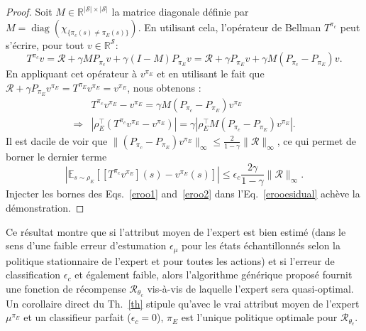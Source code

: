\documentclass[french,utf8]{./hermes-journal}
\newcommand{\diag}{\operatorname*{diag}}
\newcommand{\R}{\mathcal{R}}
\newcommand{\s}{\mathcal{S}}
\newcommand{\E}{\mathbb{E}}
\begin{document}
\begin{proof}
   Soit $M\in\mathbb{R}^{|\s|\times |\s|}$ la matrice diagonale définie par $M = \diag (\chi_{\{\pi_c(s)\neq\pi_E(s)\}})$. En utilisant cela, l'opérateur de Bellman $T^{\pi_c}$ peut s'écrire, pour tout $v\in\mathbb{R}^\s$:
  \begin{equation}
    T^{\pi_c}v = \R + \gamma M P_{\pi_c} v + \gamma (I-M)P_{\pi_E} v
    = \R + \gamma P_{\pi_E} v + \gamma M (P_{\pi_c}-P_{\pi_E})v.
  \end{equation}
  En appliquant cet opérateur à  $v^{\pi_E}$ et en utilisant le fait que $\R +
  \gamma P_{\pi_E} v^{\pi_E} = T^{\pi_E} v^{\pi_E} = v^{\pi_E}$, nous obtenons :
  \begin{align}
    &T^{\pi_c}v^{\pi_E} - v^{\pi_E} = \gamma M
    (P_{\pi_c}-P_{\pi_E})v^{\pi_E}
    \\\Rightarrow &|\rho_E^\top (T^{\pi_c}v^{\pi_E} - v^{\pi_E})| = \gamma
    |\rho_E^\top M (P_{\pi_c}-P_{\pi_E})v^{\pi_E}|.
  \end{align}
  Il est dacile de voir que $\|(P_{\pi_c}-P_{\pi_E})v^{\pi_E}\|_\infty
  \leq \frac{2}{1-\gamma}\|\R\|_\infty$, ce qui permet de borner le dernier terme
  \begin{equation}
    |\E_{s\sim\rho_E}[[T^{\pi_c}v^{\pi_E}](s) - v^{\pi_E}(s)]| \leq
    \epsilon_c \frac{2\gamma}{1-\gamma} \|\R\|_\infty.
    \label{eroo2}
  \end{equation}
  Injecter les bornes des Eqs.~\eqref{eroo1}
  and~\eqref{eroo2} dans l'Eq.~\eqref{erooesidual} achève la démonstration.%
\end{proof}

Ce résultat montre que si l'attribut moyen de l'expert est bien estimé (dans le sens d'une faible erreur d'estumation $\epsilon_\mu$ pour les états échantillonnés selon la politique stationnaire de l'expert et pour toutes les actions) et si l'erreur de classification $\epsilon_c$ et également faible, alors l'algorithme générique proposé fournit une fonction de récompense 
$\R_{\theta_c}$ vis-à-vis de laquelle l'expert sera quasi-optimal. Un corollaire direct du Th.~\ref{th} stipule qu'avec le vrai attribut moyen de l'expert $\mu^{\pi_E}$ et un classifieur parfait 
($\epsilon_c=0$), $\pi_E$ est l'unique politique optimale pour 
$\R_{\theta_c}$.
\end{document}
